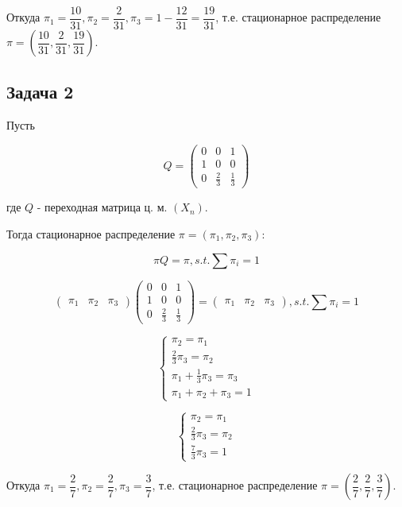 \documentclass[a4paper,12pt]{article} %
\begin{document}
Откуда $\pi_{1} = \dfrac{10}{31}, \pi_{2} = \dfrac{2}{31}, \pi_{3} = 1 - \dfrac{12}{31} =  \dfrac{19}{31}$, т.е. стационарное распределение   \newline
$\pi=\left(\dfrac{10}{31}, \dfrac{2}{31}, \dfrac{19}{31}\right)$.


\subsection*{Задача 2}


Пусть

$$Q=\left(\begin{array}{ccc}
0 & 0 & 1 \\
1 & 0 & 0 \\
0 & \frac{2}{3} & \frac{1}{3}
\end{array}\right)$$

где $Q$ - переходная матрица ц. м.  $(X_n)$. 


Тогда стационарное распределение $\pi=\left(\pi_{1}, \pi_{2}, \pi_{3}\right)$:

$$\pi Q=\pi, s.t. \sum \pi_i = 1 $$


$$\left(\begin{array}{lll}
\pi_{1} & \pi_{2} & \pi_{3}
\end{array}\right)\left(\begin{array}{lll}
0 & 0 & 1 \\
1 & 0 & 0 \\
0 & \frac{2}{3} & \frac{1}{3}
\end{array}\right)=\left(\begin{array}{lll}
\pi_{1} & \pi_{2} & \pi_{3}
\end{array}\right), s.t. \sum \pi_i = 1 $$

$$\left\{\begin{array}{l}
\pi_{2}=\pi_{1} \\
\frac{2}{3} \pi_{3}=\pi_{2} \\
\pi_{1}+\frac{1}{3} \pi_{3}=\pi_{3} \\ \pi_{1}+\pi_{2}+\pi_{3}=1
\end{array}\right. $$

$$\left\{\begin{array}{l}
\pi_{2}=\pi_{1} \\
\frac{2}{3} \pi_{3}=\pi_{2} \\
 \frac{7}{3} \pi_{3} =1
\end{array}\right. $$



Откуда $\pi_{1} = \dfrac{2}{7}, \pi_{2} = \dfrac{2}{7}, \pi_{3} =  \dfrac{3}{7}$, т.е. стационарное распределение   \newline
$\pi=\left(\dfrac{2}{7}, \dfrac{2}{7}, \dfrac{3}{7}\right)$.
\end{document}
